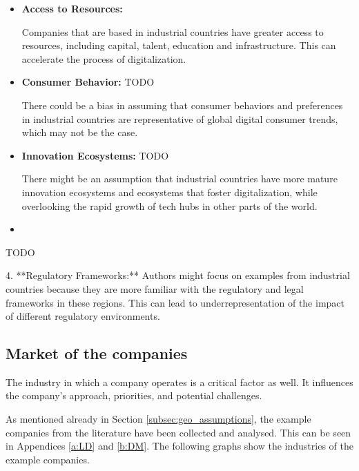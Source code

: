 \documentclass[a4]{scrartcl}
\begin{document}
\begin{itemize}
	
	\item \textbf{Access to Resources:} 
	
	Companies that are based in industrial countries have greater access to resources, including capital, talent, education and infrastructure. This can accelerate the process of digitalization. \cite{riic1, riic2}
	
	\item \textbf{Consumer Behavior:} TODO
	
	There could be a bias in assuming that consumer behaviors and preferences in industrial countries are representative of global digital consumer trends, which may not be the case.
	
	\item \textbf{Innovation Ecosystems:}  TODO
	
	There might be an assumption that industrial countries have more mature innovation ecosystems and ecosystems that foster digitalization, while overlooking the rapid growth of tech hubs in other parts of the world.
	
	\item 
	
\end{itemize}

	TODO

	4. **Regulatory Frameworks:** Authors might focus on examples from industrial countries because they are more familiar with the regulatory and legal frameworks in these regions. This can lead to underrepresentation of the impact of different regulatory environments.











\subsection{Market of the companies} \label{subsec:market_assumptions}

The industry in which a company operates  is a critical factor as well. It influences the company's approach, priorities, and potential challenges.

As mentioned already in Section \ref{subsec:geo_assumptions}, the example companies from the literature have been collected and analysed. This can be seen in Appendices \ref{a:LD} and \ref{b:DM}. The following graphs show the industries of the example companies.
\end{document}
